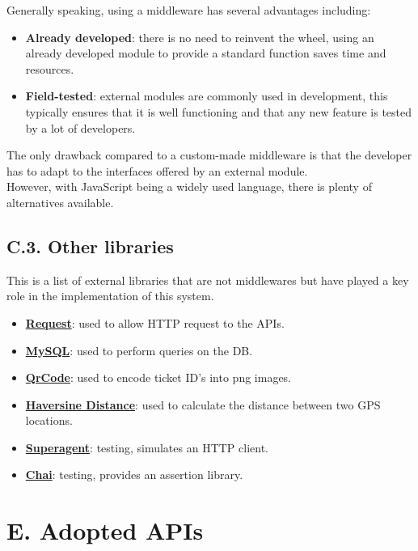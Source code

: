 Generally speaking, using a middleware has several advantages including:
\begin{itemize}
  \item \textbf{Already developed}: there is no need to reinvent the wheel, using an already developed module to provide a standard function saves time and resources.
  \item \textbf{Field-tested}: external modules are commonly used in development, this typically ensures that it is well functioning and that any new feature is tested by a lot of developers.
\end{itemize}
The only drawback compared to a custom-made middleware is that the developer has to adapt to the interfaces offered by an external module.\\
However, with JavaScript being a widely used language, there is plenty of alternatives available.

\subsection{C.3. Other libraries}

This is a list of external libraries that are not middlewares but have played a key role in the implementation of this system.

\begin{itemize}
  \item \textbf{\href{https://www.npmjs.com/package/request}{Request}}: used to allow HTTP request to the APIs.
  \item \textbf{\href{https://www.npmjs.com/package/mysql}{MySQL}}: used to perform queries on the DB.
  \item \textbf{\href{https://www.npmjs.com/package/qrcode}{QrCode}}: used to encode ticket ID's into png images.
  \item \textbf{\href{https://www.npmjs.com/package/haversine-distance}{Haversine Distance}}: used to calculate the distance between two GPS locations.
  \item \textbf{\href{https://www.npmjs.com/package/superagent}{Superagent}}: testing, simulates an HTTP client.
  \item \textbf{\href{https://www.npmjs.com/package/chai}{Chai}}: testing, provides an assertion library.
\end{itemize}

\section{E. Adopted APIs}

